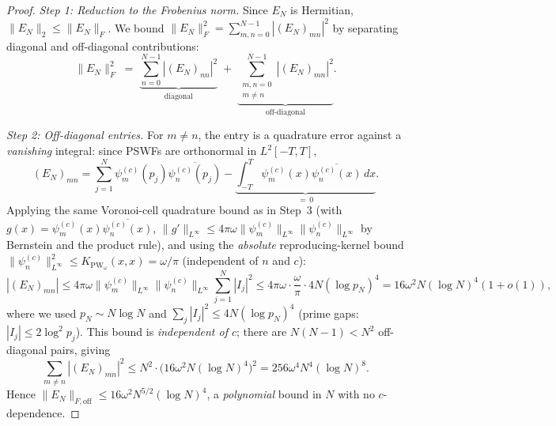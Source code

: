 \documentclass[12pt,a4paper]{amsart}
\theoremstyle{definition}
\newcommand{\PW}{\mathrm{PW}_\omega}
\newcommand{\psin}{\psi_n^{(c)}}
\newcommand{\EN}{E_N}
\newcommand{\norm}[1]{\|#1\|}
\begin{document}
\begin{proof}
\textit{Step 1: Reduction to the Frobenius norm.}
Since $\EN$ is Hermitian, $\norm{\EN}_2\leq\norm{\EN}_F$.
We bound $\norm{\EN}_F^2=\sum_{m,n=0}^{N-1}|(\EN)_{mn}|^2$
by separating diagonal and off-diagonal contributions:
\[
  \norm{\EN}_F^2
  \;=\;
  \underbrace{\sum_{n=0}^{N-1}|(\EN)_{nn}|^2}_{\text{diagonal}}
  \;+\;
  \underbrace{\sum_{\substack{m,n=0\\m\neq n}}^{N-1}|(\EN)_{mn}|^2}_{\text{off-diagonal}}.
\]

\textit{Step 2: Off-diagonal entries.}
For $m\neq n$, the entry is a quadrature error against a
\emph{vanishing} integral: since PSWFs are orthonormal in $L^2[-T,T]$,
\[
  (\EN)_{mn}
  = \sum_{j=1}^N\psi_m^{(c)}(p_j)\overline{\psi_n^{(c)}(p_j)}
    - \underbrace{\int_{-T}^T\psi_m^{(c)}(x)\overline{\psi_n^{(c)}(x)}\,dx}_{=\,0}.
\]
Applying the same Voronoi-cell quadrature bound as in Step~3
(with $g(x)=\psi_m^{(c)}(x)\overline{\psi_n^{(c)}(x)}$,
$\norm{g'}_{L^\infty}\leq 4\pi\omega\norm{\psi_m^{(c)}}_{L^\infty}
\norm{\psi_n^{(c)}}_{L^\infty}$ by Bernstein and the product rule),
and using the \emph{absolute} reproducing-kernel bound
$\norm{\psin}_{L^\infty}^2\leq K_{\PW}(x,x)=\omega/\pi$
\cite[Eq.~(3)]{BonamiKaroui} (independent of $n$ and $c$):
\[
  |(\EN)_{mn}|
  \leq 4\pi\omega\norm{\psi_m^{(c)}}_{L^\infty}\norm{\psi_n^{(c)}}_{L^\infty}
  \sum_{j=1}^N|I_j|^2
  \leq 4\pi\omega\cdot\frac{\omega}{\pi}\cdot 4N(\log p_N)^4
  = 16\omega^2 N(\log N)^4(1+o(1)),
\]
where we used $p_N\sim N\log N$ and $\sum_j|I_j|^2\leq 4N(\log p_N)^4$
(prime gaps: $|I_j|\leq 2\log^2 p_j$).
This bound is \emph{independent of $c$}; there are $N(N-1)<N^2$
off-diagonal pairs, giving
\[
  \sum_{m\neq n}|(\EN)_{mn}|^2
  \leq N^2\cdot\bigl(16\omega^2 N(\log N)^4\bigr)^2
  = 256\omega^4 N^4(\log N)^8.
\]
Hence $\norm{\EN}_{F,\mathrm{off}}\leq 16\omega^2 N^{5/2}(\log N)^4$,
a \emph{polynomial} bound in $N$ with no $c$-dependence.


\end{proof}
\end{document}
